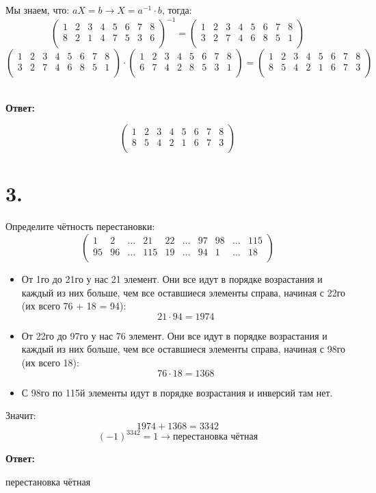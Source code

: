 \documentclass[a4paper,12pt]{article}
\begin{document}
Мы знаем, что:
$aX = b \rightarrow X = a^{-1} \cdot b$, тогда: 
\[
\begin{pmatrix}
1 & 2 & 3 & 4 & 5 & 6 & 7 & 8 \\
8 & 2 & 1 & 4 & 7 & 5 & 3 & 6\\
\end{pmatrix}^{-1} 
=
\begin{pmatrix}
1 & 2 & 3 & 4 & 5 & 6 & 7 & 8 \\
3 & 2 & 7 & 4 & 6 & 8 & 5 & 1\\
\end{pmatrix}
\]
\[
\begin{pmatrix}
1 & 2 & 3 & 4 & 5 & 6 & 7 & 8 \\
3 & 2 & 7 & 4 & 6 & 8 & 5 & 1\\
\end{pmatrix}
\cdot
\begin{pmatrix}
1 & 2 & 3 & 4 & 5 & 6 & 7 & 8 \\
6 & 7& 4& 2 & 8 & 5 & 3 & 1 \\
\end{pmatrix}
= 
\begin{pmatrix}
1 & 2 & 3 & 4 & 5 & 6 & 7 & 8 \\
8 & 5 & 4 & 2 & 1 & 6 & 7 & 3 \\
\end{pmatrix}
\]
\\
\begin{center}
\textbf{Ответ:}
\end{center}
\[
\begin{pmatrix}
1 & 2 & 3 & 4 & 5 & 6 & 7 & 8 \\
8 & 5 & 4 & 2 & 1 & 6 & 7 & 3 \\
\end{pmatrix}
\]
\newpage
\section*{3.}
Определите чётность перестановки:
\[
\begin{pmatrix}
1 & 2 & \ldots & 21 & 22 & \ldots & 97 & 98 & \ldots & 115 \\
95 & 96 & \ldots & 115 & 19 & \ldots & 94 & 1 & \ldots &18 \\
\end{pmatrix}
\]
\begin{itemize}
\item От 1го до 21го у нас 21 элемент. Они все идут в порядке возрастания и каждый из них больше, чем все оставшиеся элементы справа, начиная с 22го (их всего 76 + 18 = 94):
\[
21 \cdot 94 = 1974
\]
\item От 22го до 97го у нас 76 элемент. Они все идут в порядке возрастания и каждый из них больше, чем все оставшиеся элементы справа, начиная с 98го (их всего 18):
\[
76 \cdot 18 = 1368
\]
\item С 98го по 115й элементы идут в порядке возрастания и инверсий там нет.
\end{itemize}
Значит:
\[
1974 + 1368 = 3342
\]
\[
(-1)^{3342} = 1 \rightarrow \text{перестановка чётная}
\]
\begin{center}
\textbf{Ответ:} 

перестановка чётная
\end{center}
\end{document}
